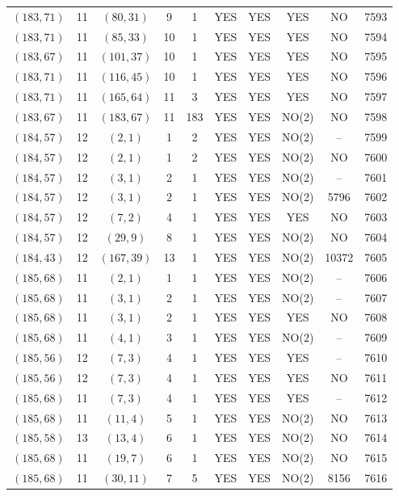 \begin{longtable}{|c|c|c|c|c|c|c|c|c|c|}
$(183, 71)$ & 11 & $(80, 31)$ & 9 & 1 & YES & YES & YES & NO & 7593\\
$(183, 71)$ & 11 & $(85, 33)$ & 10 & 1 & YES & YES & YES & NO & 7594\\
$(183, 67)$ & 11 & $(101, 37)$ & 10 & 1 & YES & YES & YES & NO & 7595\\
$(183, 71)$ & 11 & $(116, 45)$ & 10 & 1 & YES & YES & YES & NO & 7596\\
$(183, 71)$ & 11 & $(165, 64)$ & 11 & 3 & YES & YES & YES & NO & 7597\\
$(183, 67)$ & 11 & $(183, 67)$ & 11 & 183 & YES & YES & NO(2) & NO & 7598\\
$(184, 57)$ & 12 & $(2, 1)$ & 1 & 2 & YES & YES & NO(2) & -- & 7599\\
$(184, 57)$ & 12 & $(2, 1)$ & 1 & 2 & YES & YES & NO(2) & NO & 7600\\
$(184, 57)$ & 12 & $(3, 1)$ & 2 & 1 & YES & YES & NO(2) & -- & 7601\\
$(184, 57)$ & 12 & $(3, 1)$ & 2 & 1 & YES & YES & NO(2) & 5796 & 7602\\
$(184, 57)$ & 12 & $(7, 2)$ & 4 & 1 & YES & YES & YES & NO & 7603\\
$(184, 57)$ & 12 & $(29, 9)$ & 8 & 1 & YES & YES & NO(2) & NO & 7604\\
$(184, 43)$ & 12 & $(167, 39)$ & 13 & 1 & YES & YES & NO(2) & 10372 & 7605\\
$(185, 68)$ & 11 & $(2, 1)$ & 1 & 1 & YES & YES & NO(2) & -- & 7606\\
$(185, 68)$ & 11 & $(3, 1)$ & 2 & 1 & YES & YES & NO(2) & -- & 7607\\
$(185, 68)$ & 11 & $(3, 1)$ & 2 & 1 & YES & YES & YES & NO & 7608\\
$(185, 68)$ & 11 & $(4, 1)$ & 3 & 1 & YES & YES & NO(2) & -- & 7609\\
$(185, 56)$ & 12 & $(7, 3)$ & 4 & 1 & YES & YES & YES & -- & 7610\\
$(185, 56)$ & 12 & $(7, 3)$ & 4 & 1 & YES & YES & YES & NO & 7611\\
$(185, 68)$ & 11 & $(7, 3)$ & 4 & 1 & YES & YES & YES & -- & 7612\\
$(185, 68)$ & 11 & $(11, 4)$ & 5 & 1 & YES & YES & NO(2) & NO & 7613\\
$(185, 58)$ & 13 & $(13, 4)$ & 6 & 1 & YES & YES & NO(2) & NO & 7614\\
$(185, 68)$ & 11 & $(19, 7)$ & 6 & 1 & YES & YES & NO(2) & NO & 7615\\
$(185, 68)$ & 11 & $(30, 11)$ & 7 & 5 & YES & YES & NO(2) & 8156 & 7616\\

\end{longtable}
